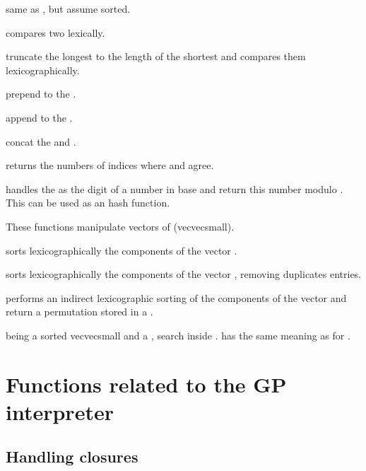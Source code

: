  same as
, but assume  sorted.

 compares two  lexically.

 truncate the longest 
to the length of the shortest and compares them lexicographically.

 prepend  to the
 .

 append  to the
 .

 concat the  
and .

 returns the numbers of indices
where  and  agree.

 handles the
  as the digit of a number in base  and return
this number modulo . This can be used as an hash function.

These functions manipulate vectors of  (vecvecsmall).

 sorts lexicographically the components of
the vector .

 sorts lexicographically the components of
the vector , removing duplicates entries.

 performs an indirect lexicographic
sorting of the components of the vector  and return a permutation
stored in a .

  being a sorted
vecvecsmall and  a , search  inside .
 has the same meaning as for .

\newpage
\chapter{Functions related to the GP interpreter}

\section{Handling closures}\label{se:closure}


